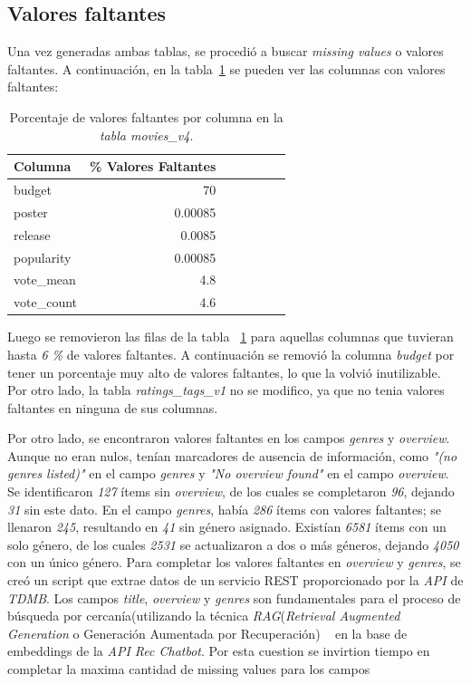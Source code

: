 \documentclass[11pt,a4paper,twoside]{thesis}
\begin{document}
\subsection{Valores faltantes}

Una vez generadas ambas tablas, se procedió a buscar \textit{missing values} o
valores faltantes. A continuación, en la tabla~\ref{table:missing-values} se pueden ver
las columnas con valores faltantes:

\begin{table}[h!]
	\centering
	\footnotesize
	\begin{tabular}{lrrrrrr}
		\hline
		Columna     & \% Valores Faltantes \\
		\hline
		budget      & 70                   \\
		poster      & 0.00085              \\
		release     & 0.0085               \\
		popularity  & 0.00085              \\
		vote\_mean  & 4.8                  \\
		vote\_count & 4.6                  \\
		\hline
	\end{tabular}
	\caption{Porcentaje de valores faltantes por columna en la \textit{tabla movies\_v4}.}
	\label{table:missing-values}
\end{table}

Luego se removieron las filas de la tabla ~\ref{table:missing-values} para aquellas columnas
que tuvieran hasta \textit{6 \%} de valores faltantes. A continuación
se removió la columna \textit{budget} por tener un porcentaje muy alto de
valores faltantes, lo que la volvió inutilizable. Por otro lado, la tabla
\textit{ratings\_tags\_v1} no se modifico, ya que no tenia valores faltantes en
ninguna de sus columnas.

Por otro lado, se encontraron valores faltantes en los campos \textit{genres} y \textit{overview}. Aunque no eran nulos, tenían marcadores de ausencia de información, como \textit{"(no genres listed)"} en el campo \textit{genres} y \textit{"No overview found"} en el campo \textit{overview}. Se identificaron \textit{127} ítems sin \textit{overview}, de los cuales se completaron \textit{96}, dejando \textit{31} sin este dato. En el campo \textit{genres}, había \textit{286} ítems con valores faltantes; se llenaron \textit{245}, resultando en \textit{41} sin género asignado. Existían \textit{6581} ítems con un solo género, de los cuales \textit{2531} se actualizaron a dos o más géneros, dejando \textit{4050} con un único género. Para completar los valores faltantes en \textit{overview} y \textit{genres}, se creó un script que extrae datos de un servicio REST proporcionado por la \textit{API} de \textit{TDMB}. Los campos \textit{title}, \textit{overview} y \textit{genres} son fundamentales para el proceso de búsqueda por cercanía(utilizando la técnica \textit{RAG}(\textit{Retrieval Augmented Generation} o Generación Aumentada por Recuperación) ~\cite{rag} en la base de embeddings de la \textit{API Rec Chatbot}. Por esta cuestion se invirtion tiempo en completar la maxima cantidad de missing values para los campos
\end{document}
